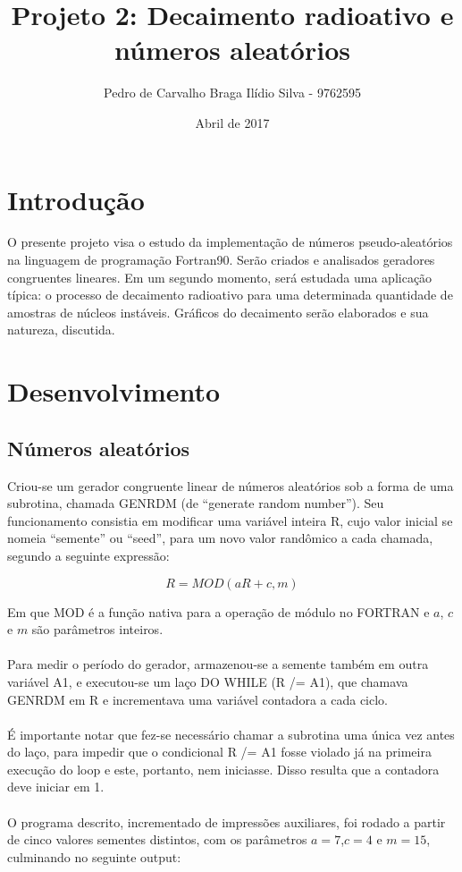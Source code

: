\documentclass{article}
\title{Projeto 2: Decaimento radioativo e números aleatórios}
\author{Pedro de Carvalho Braga Ilídio Silva - 9762595}
\date{Abril de 2017}
\begin{document}
\maketitle

\section{Introdução}

O presente projeto visa o estudo da implementação de números pseudo-aleatórios na linguagem de programação Fortran90. Serão criados e analisados geradores congruentes lineares. Em um segundo momento, será estudada uma aplicação típica: o processo de decaimento radioativo para uma determinada quantidade de amostras de núcleos instáveis. Gráficos do decaimento serão elaborados e sua natureza, discutida.

\section{Desenvolvimento}

\subsection{Números aleatórios}

Criou-se um gerador congruente linear de números aleatórios sob a forma de uma subrotina, chamada GENRDM (de ``generate random number''). Seu funcionamento consistia em modificar uma variável inteira R, cujo valor inicial se nomeia ``semente'' ou ``seed'', para um novo valor randômico a cada chamada, segundo a seguinte expressão:


\begin{displaymath}
  \label{eq:gerador}
  R=MOD(aR+c, m)
\end{displaymath}

Em que MOD é a função nativa para a operação de módulo no FORTRAN e \(a\), \(c\) e \(m\) são parâmetros inteiros. \paragraph{}
Para medir o período do gerador, armazenou-se a semente também em outra variável A1, e executou-se um laço DO WHILE (R /= A1), que chamava GENRDM em R e incrementava uma variável contadora a cada ciclo.\paragraph{}
É importante notar que fez-se necessário chamar a subrotina uma única vez antes do laço, para impedir que o condicional R /= A1 fosse violado já na primeira execução do loop e este, portanto, nem iniciasse. Disso resulta que a contadora deve iniciar em 1.\paragraph{}
O programa descrito, incrementado de impressões auxiliares, foi rodado a partir de cinco valores sementes distintos, com os parâmetros \(a=7\),\(c=4\) e \(m = 15\), culminando no seguinte output:
\end{document}
